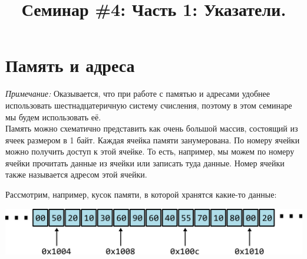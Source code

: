 \documentclass{article}
\begin{document}


\title{Семинар \#4: Часть 1: Указатели. \vspace{-5ex}}\date{}\maketitle
\section*{Память и адреса}

\textit{Примечание:} Оказывается, что при работе с памятью и адресами удобнее использовать шестнадцатеричную систему счисления, поэтому в этом семинаре мы будем использовать её.\\

Память можно схематично представить как очень большой массив, состоящий из ячеек размером в 1 байт.
Каждая ячейка памяти занумерована. По номеру ячейки можно получить доступ к этой ячейке.
То есть, например, мы можем по номеру ячейки прочитать данные из ячейки или записать туда данные.
Номер ячейки также называется адресом этой ячейки.

Рассмотрим, например, кусок памяти, в которой хранятся какие-то данные:

\begin{center}
\includegraphics[scale=1]{../images/memory1.png}
\end{center}
\end{document}
